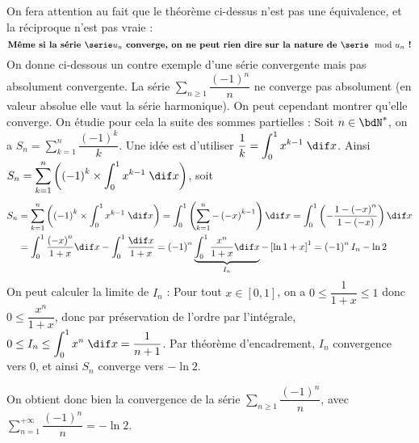 \documentclass[a4paper,french,bookmarks]{article}
\begin{document}
%
\begin{warning}{}{}
    On fera attention au fait que le théorème ci-dessus n'est pas une équivalence, et la réciproque n'est pas vraie :
    \[ \text{\bf{Même si la série $\serie u_n$ converge, on ne peut rien dire sur la nature de $\serie \mod{u_n}$ !}} \]
    On donne ci-dessous un contre exemple d'une série convergente mais pas absolument convergente.
    \tcblower
    La série $\sum\limits_{n \geq 1} \dfrac{\left(-1\right)^n}{n}$ ne converge pas absolument (en valeur absolue elle vaut la série harmonique). On peut cependant montrer qu'elle converge. On étudie pour cela la suite des sommes partielles : Soit $n \in \bdN^*$, on a $S_n = \displaystyle\sum_{k=1}^n \dfrac{\left(-1\right)^k}{k}$. Une idée est d'utiliser $\dfrac{1}{k} = \displaystyle\int_0^1 x^{k-1}\; \dif x$. Ainsi $\displaystyle S_n = \sum_{k=1}^n \left(\left(-1\right)^k\times\int_0^1 x^{k-1}\; \dif x\right)$, soit
    \begin{align*}
        S_n &= \sum_{k=1}^n \left(\left(-1\right)^k\times\int_0^1 x^{k-1}\; \dif x\right) = \int_0^1 \left(\sum_{k=1}^n - \left(-x\right)^{k-1}\right)\dif x = \int_0^1 \left(- \dfrac{1-\left(-x\right)^n}{1-\left(-x\right)}\right)\dif x\\
        &= \int_0^1 \dfrac{\left(-x\right)^n}{1+x}\dif x - \int_0^1 \dfrac{\dif x}{1 + x} = \left(-1\right)^n \underbrace{\int_0^1 \dfrac{x^n}{1+x}\dif x}_{I_n} - \left[\ln{1+x}\right]^1 = \left(-1\right)^nI_n - \ln{2}
    \end{align*}
    On peut calculer la limite de $I_n$ : Pour tout $x \in \left[0, 1\right]$, on a $0 \leq \dfrac{1}{1+x} \leq 1$ donc $0 \leq \dfrac{x^n}{1+x}$, donc par préservation de l'ordre par l'intégrale, $\displaystyle 0 \leq I_n \leq \int_0^1 x^n\; \dif x = \dfrac{1}{n+1}$. Par théorème d'encadrement, $I_n$ convergence vers $0$, et ainsi $S_n$ converge vers $-\ln 2$.
    
    On obtient donc bien la convergence de la série $\sum\limits_{n \geq 1} \dfrac{\left(-1\right)^n}{n}$, avec $\displaystyle\sum_{n=1}^{+\infty} \dfrac{\left(-1\right)^n}{n} = -\ln 2$.
\end{warning}
%
\end{document}
